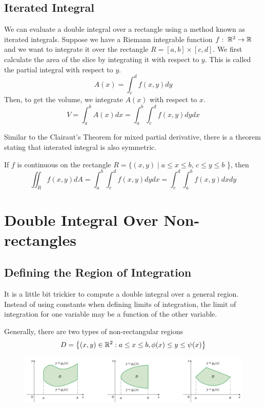 \subsection{Iterated Integral}

We can evaluate a double integral over a rectangle using a method known as iterated integrals. Suppose we have a Riemann integrable function $f:\; {\mathbb R}^2 \to {\mathbb R}$ and we want to integrate it over the rectangle $R=[a,b]\times[c,d]$. We first calculate the area of the slice by integrating it with respect to $y$. This is called the partial integral with respect to $y$.
$$
A(x) = \int_c^d f(x,y) dy
$$
Then, to get the volume, we integrate $A(x)$ with respect to $x$.
$$
V = \int_a^b A(x) dx = \int_a^b\int_c^d f(x,y) dy dx
$$

Similar to the Clairaut's Theorem for mixed partial derivative, there is a theorem stating that interated integral is also symmetric.

\begin{theorem}
If $f$ is continuous on the rectangle $R = \{(x,y) \mid a \leq x \leq b,\, c \leq y \leq b$ \}, then
$$
\iint_R f(x,y) dA = \int_a^b \int_c^d f(x,y) dy dx = \int_c^d \int_a^b f(x,y) dx dy
$$
\end{theorem}

\section{Double Integral Over Non-rectangles}
\subsection{Defining the Region of Integration}

It is a little bit trickier to compute a double integral over a general region. Instead of using constants when defining limits of integration, the limit of integration for one variable may be a function of the other variable.

Generally, there are two types of non-rectangular regions
$$
D = \left\{(x,y)\in {\mathbb R}^2 : a\le x \le b, \phi(x) \le y \le \psi(x)\right\}
$$
\begin{figure}[h]
    \centering
    \includegraphics[width=\linewidth]{figures/type1-gen-region.png}
\end{figure}

